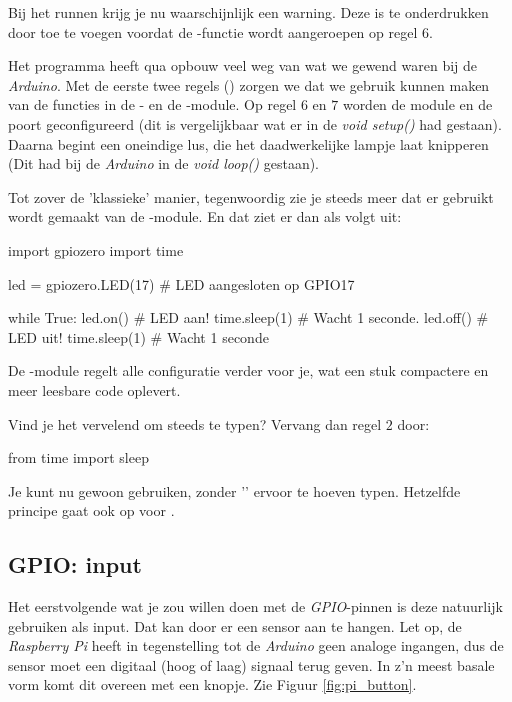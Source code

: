 \begin{remark}
Bij het runnen krijg je nu waarschijnlijk een warning. Deze is te onderdrukken door  toe te voegen voordat de -functie wordt aangeroepen op regel $6$.
\end{remark}

Het programma heeft qua opbouw veel weg van wat we gewend waren bij de \textit{Arduino}. Met de eerste twee regels () zorgen we dat we gebruik kunnen maken van de functies in de - en de -module. Op regel $6$ en $7$ worden de module en de poort geconfigureerd (dit is vergelijkbaar wat er in de \textit{void setup()} had gestaan). Daarna begint een oneindige lus, die het daadwerkelijke lampje laat knipperen (Dit had bij de \textit{Arduino} in de \textit{void loop()} gestaan). 

Tot zover de 'klassieke' manier, tegenwoordig zie je steeds meer dat er gebruikt wordt gemaakt van de -module. En dat ziet er dan als volgt uit:
\begin{python}
import gpiozero
import time

led = gpiozero.LED(17)  # LED aangesloten op GPIO17
 
while True: 
    led.on()       # LED aan!
    time.sleep(1)  # Wacht 1 seconde.
    led.off()      # LED uit!
    time.sleep(1)  # Wacht 1 seconde
\end{python}

De -module regelt alle configuratie verder voor je, wat een stuk compactere en meer leesbare code oplevert. 
\begin{remark}
\label{sec:piledobj}
Vind je het vervelend om steeds  te typen? Vervang dan regel $2$ door: 
\begin{python}
from time import sleep
\end{python}
Je kunt nu gewoon  gebruiken, zonder '' ervoor te hoeven typen. Hetzelfde principe gaat ook op voor .
\end{remark}

\newpage

\subsection{GPIO: input}
Het eerstvolgende wat je zou willen doen met de \textit{GPIO}-pinnen is deze natuurlijk gebruiken als input. Dat kan door er een sensor aan te hangen. Let op, de \textit{Raspberry Pi} heeft in tegenstelling tot de \textit{Arduino} geen analoge ingangen, dus de sensor moet een digitaal (hoog of laag) signaal terug geven. In z'n meest basale vorm komt dit overeen met een knopje. Zie Figuur \ref{fig:pi_button}. 

